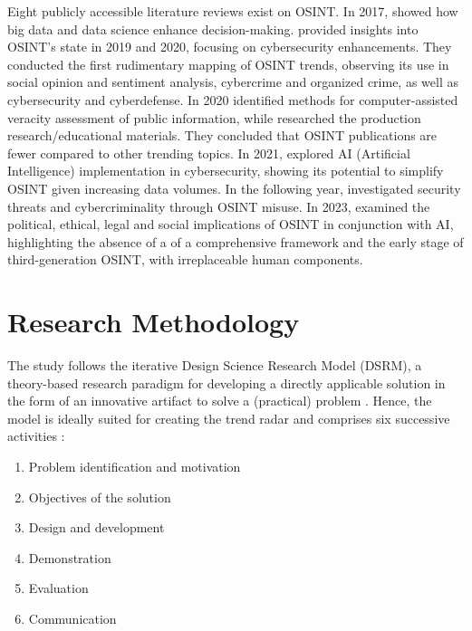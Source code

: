 \documentclass[10pt]{article}
\begin{document}
Eight publicly accessible literature reviews exist on OSINT. In 2017, \cite{DosPassos.2017} showed how big data and data science enhance decision-making. \cite{PastorGalindo.2019, PastorGalindo.2020}
provided insights into OSINT's state in 2019 and 2020, focusing on cybersecurity
enhancements. They conducted the first rudimentary mapping of OSINT trends, observing its use in social opinion and sentiment
analysis, cybercrime and organized crime, as well as cybersecurity and cyberdefense. In 2020 \cite{GarciaLozano.2020} identified methods for computer-assisted veracity assessment of public information, while
\cite{HerreraCubides.2020} researched the production research/educational materials. They concluded that OSINT
publications are fewer compared to other trending topics. In 2021, \cite{Yogish.2021} explored AI (Artificial Intelligence) implementation in cybersecurity,
showing its potential to simplify OSINT given increasing data volumes. In the following year,
\cite{Hwang.2022} investigated security threats and cybercriminality through OSINT misuse.
In 2023, \cite{Ghioni.2023} examined the political, ethical, legal and social implications of
OSINT in conjunction with AI, highlighting the absence of a of a comprehensive framework and the early stage of third-generation OSINT, with irreplaceable human components.

\section{Research Methodology}

The study follows the iterative Design Science Research Model (DSRM),
a theory-based research paradigm for developing a directly applicable solution in the form of an innovative artifact \cite{vomBrocke.2020b}
to solve a (practical) problem \cite{Peffers.2007}. Hence, the model is ideally suited for creating the trend radar and comprises
six successive activities \cite{Peffers.2007}:

\begin{enumerate}[itemsep=.5pt,parsep=1pt,topsep=1pt]
    \item Problem identification and motivation
    \item Objectives of the solution
    \item Design and development
    \item Demonstration
    \item Evaluation
    \item Communication
\end{enumerate}
\end{document}
